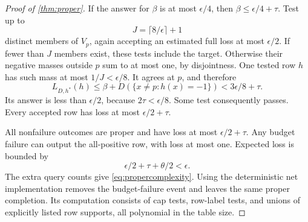 \begin{proof}[Proof of \cref{thm:proper}]
If the answer for $\beta$ is at most $\epsilon/4$, then $\beta\le\epsilon/4+\tau$. Test up to
\[
 J=\lceil8/\epsilon\rceil+1
\]
distinct members of $V_p$, again accepting an estimated full loss at most $\epsilon/2$. If fewer than $J$ members exist, these tests include the target. Otherwise their negative masses outside $p$ sum to at most one, by disjointness. One tested row $h$ has such mass at most $1/J<\epsilon/8$. It agrees at $p$, and therefore
\[
 L_{D,h^*}(h)\le\beta+D(\{x\ne p:h(x)=-1\})
 <3\epsilon/8+\tau.
\]
Its answer is less than $\epsilon/2$, because $2\tau<\epsilon/8$. Some test consequently passes. Every accepted row has loss at most $\epsilon/2+\tau$.

All nonfailure outcomes are proper and have loss at most $\epsilon/2+\tau$. Any budget failure can output the all-positive row, with loss at most one. Expected loss is bounded by
\[
 \epsilon/2+\tau+\theta/2<\epsilon.
\]
The extra query counts give \eqref{eq:propercomplexity}. Using the deterministic net implementation removes the budget-failure event and leaves the same proper completion. Its computation consists of cap tests, row-label tests, and unions of explicitly listed row supports, all polynomial in the table size.
\end{proof}
